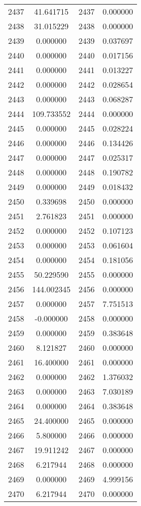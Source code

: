 \documentclass[12pt]{article}
\begin{document}
\begin{longtable}{@{}cccc@{}}
2437 & 41.641715 & 2437 & 0.000000 \\
2438 & 31.015229 & 2438 & 0.000000 \\
2439 & 0.000000 & 2439 & 0.037697 \\
2440 & 0.000000 & 2440 & 0.017156 \\
2441 & 0.000000 & 2441 & 0.013227 \\
2442 & 0.000000 & 2442 & 0.028654 \\
2443 & 0.000000 & 2443 & 0.068287 \\
2444 & 109.733552 & 2444 & 0.000000 \\
2445 & 0.000000 & 2445 & 0.028224 \\
2446 & 0.000000 & 2446 & 0.134426 \\
2447 & 0.000000 & 2447 & 0.025317 \\
2448 & 0.000000 & 2448 & 0.190782 \\
2449 & 0.000000 & 2449 & 0.018432 \\
2450 & 0.339698 & 2450 & 0.000000 \\
2451 & 2.761823 & 2451 & 0.000000 \\
2452 & 0.000000 & 2452 & 0.107123 \\
2453 & 0.000000 & 2453 & 0.061604 \\
2454 & 0.000000 & 2454 & 0.181056 \\
2455 & 50.229590 & 2455 & 0.000000 \\
2456 & 144.002345 & 2456 & 0.000000 \\
2457 & 0.000000 & 2457 & 7.751513 \\
2458 & -0.000000 & 2458 & 0.000000 \\
2459 & 0.000000 & 2459 & 0.383648 \\
2460 & 8.121827 & 2460 & 0.000000 \\
2461 & 16.400000 & 2461 & 0.000000 \\
2462 & 0.000000 & 2462 & 1.376032 \\
2463 & 0.000000 & 2463 & 7.030189 \\
2464 & 0.000000 & 2464 & 0.383648 \\
2465 & 24.400000 & 2465 & 0.000000 \\
2466 & 5.800000 & 2466 & 0.000000 \\
2467 & 19.911242 & 2467 & 0.000000 \\
2468 & 6.217944 & 2468 & 0.000000 \\
2469 & 0.000000 & 2469 & 4.999156 \\
2470 & 6.217944 & 2470 & 0.000000 \\

\end{longtable}
\end{document}
